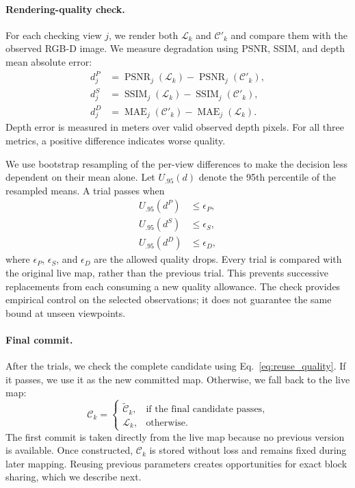 \paragraph{Rendering-quality check.}
For each checking view $j$, we render both $\mathcal{L}_k$ and
$\mathcal{C}'_k$ and compare them with the observed RGB-D image.
We measure degradation using PSNR, SSIM, and depth mean absolute error:
\begin{align}
    d_j^{P}
    &=
    \operatorname{PSNR}_j(\mathcal{L}_k)
    -
    \operatorname{PSNR}_j(\mathcal{C}'_k),\\
    d_j^{S}
    &=
    \operatorname{SSIM}_j(\mathcal{L}_k)
    -
    \operatorname{SSIM}_j(\mathcal{C}'_k),\\
    d_j^{D}
    &=
    \operatorname{MAE}_j(\mathcal{C}'_k)
    -
    \operatorname{MAE}_j(\mathcal{L}_k).
\end{align}
Depth error is measured in meters over valid observed depth pixels.
For all three metrics, a positive difference indicates worse quality.

We use bootstrap resampling of the per-view differences to make
the decision less dependent on their mean alone.
Let $U_{.95}(d)$ denote the 95th percentile of the resampled means.
A trial passes when
\begin{equation}
    \begin{aligned}
        U_{.95}(d^{P}) &\leq \epsilon_P,\\
        U_{.95}(d^{S}) &\leq \epsilon_S,\\
        U_{.95}(d^{D}) &\leq \epsilon_D,
    \end{aligned}
    \label{eq:reuse_quality}
\end{equation}
where $\epsilon_P$, $\epsilon_S$, and $\epsilon_D$ are the allowed
quality drops.
Every trial is compared with the original live map, rather than
the previous trial.
This prevents successive replacements from each consuming a new
quality allowance.
The check provides empirical control on the selected observations;
it does not guarantee the same bound at unseen viewpoints.

\paragraph{Final commit.}
After the trials, we check the complete candidate using
Eq.~\eqref{eq:reuse_quality}.
If it passes, we use it as the new committed map.
Otherwise, we fall back to the live map:
\begin{equation}
    \mathcal{C}_k =
    \begin{cases}
        \widetilde{\mathcal{C}}_k,
        & \text{if the final candidate passes},\\
        \mathcal{L}_k,
        & \text{otherwise}.
    \end{cases}
\end{equation}
The first commit is taken directly from the live map because no
previous version is available.
Once constructed, $\mathcal{C}_k$ is stored without loss and remains
fixed during later mapping.
Reusing previous parameters creates opportunities for exact block
sharing, which we describe next.

